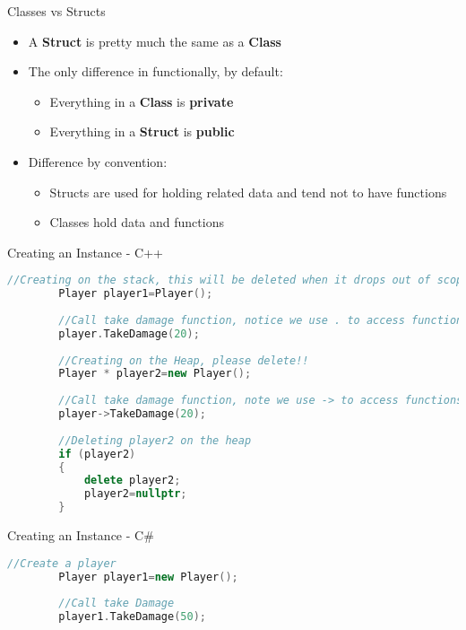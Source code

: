 \begin{frame}{Classes vs Structs}
\begin{itemize}
	\pause \item A \textbf{Struct} is pretty much the same as a \textbf{Class}
	\pause \item The only difference in functionally, by default:
	\begin{itemize}
		\pause \item Everything in a \textbf{Class} is \textbf{private}
		\pause \item Everything in a \textbf{Struct} is \textbf{public}
	\end{itemize}
	\pause \item Difference by convention:
	\begin{itemize}
		\pause \item Structs are used for holding related data and tend not to have functions
		\pause \item Classes hold data and functions
	\end{itemize}
\end{itemize}
\end{frame}

\begin{frame}[fragile]{Creating an Instance - C++}
	\begin{lstlisting}[language=C++,basicstyle=\tiny,]
		//Creating on the stack, this will be deleted when it drops out of scope
		Player player1=Player();
		
		//Call take damage function, notice we use . to access functions
		player.TakeDamage(20);
		
		//Creating on the Heap, please delete!!
		Player * player2=new Player();
		
		//Call take damage function, note we use -> to access functions
		player->TakeDamage(20);
		
		//Deleting player2 on the heap
		if (player2)
		{
			delete player2;
			player2=nullptr;
		}
	\end{lstlisting}
\end{frame}

\begin{frame}[fragile]{Creating an Instance - C\#}
	\begin{lstlisting}[language=C++,basicstyle=\tiny,]
		//Create a player
		Player player1=new Player();
		
		//Call take Damage
		player1.TakeDamage(50);
	\end{lstlisting}
\end{frame}


